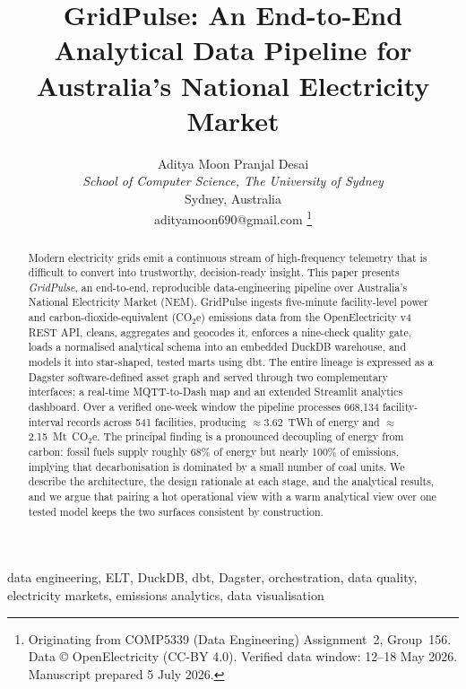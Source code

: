 \documentclass[onecolumn,11pt]{IEEEtran}
\begin{document}
\title{GridPulse: An End-to-End Analytical Data Pipeline for\\
Australia's National Electricity Market}

\author{%
{\large Aditya Moon \qquad Pranjal Desai}\\[3pt]
\textit{School of Computer Science, The University of Sydney}\\
Sydney, Australia\\
adityamoon690@gmail.com
\thanks{Originating from COMP5339 (Data Engineering) Assignment~2, Group~156.
Data \copyright{} OpenElectricity (CC-BY 4.0). Verified data window:
12--18 May 2026. Manuscript prepared 5 July 2026.}}

\maketitle

\begin{abstract}
Modern electricity grids emit a continuous stream of high-frequency telemetry
that is difficult to convert into trustworthy, decision-ready insight. This
paper presents \emph{GridPulse}, an end-to-end, reproducible data-engineering
pipeline over Australia's National Electricity Market (NEM). GridPulse ingests
five-minute facility-level power and carbon-dioxide-equivalent (CO$_2$e)
emissions data from the OpenElectricity v4 REST API, cleans, aggregates and
geocodes it, enforces a nine-check quality gate, loads a normalised analytical
schema into an embedded DuckDB warehouse, and models it into star-shaped,
tested marts using dbt. The entire lineage is expressed as a Dagster
software-defined asset graph and served through two complementary interfaces: a
real-time MQTT-to-Dash map and an extended Streamlit analytics dashboard.
Over a verified one-week window the pipeline processes 668{,}134 facility-interval
records across 541 facilities, producing $\approx$3.62~TWh of energy and
$\approx$2.15~Mt~CO$_2$e. The principal finding is a pronounced decoupling of
energy from carbon: fossil fuels supply roughly 68\% of energy but nearly 100\%
of emissions, implying that decarbonisation is dominated by a small number of
coal units. We describe the architecture, the design rationale at each stage,
and the analytical results, and we argue that pairing a hot operational view
with a warm analytical view over one tested model keeps the two surfaces
consistent by construction.
\end{abstract}

\begin{IEEEkeywords}
data engineering, ELT, DuckDB, dbt, Dagster, orchestration, data quality,
electricity markets, emissions analytics, data visualisation
\end{IEEEkeywords}
\end{document}
